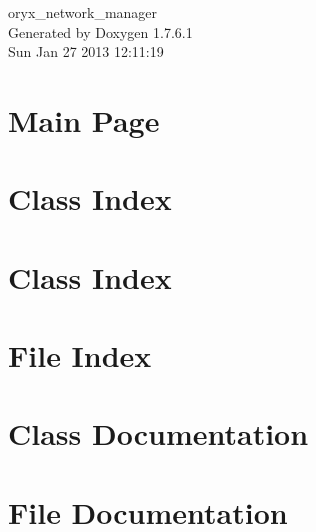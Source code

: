 \documentclass[a4paper]{book}
\begin{document}
\begin{titlepage}
\vspace*{7cm}
\begin{center}
{\Large oryx\-\_\-network\-\_\-manager }\\
\vspace*{1cm}
{\large \-Generated by Doxygen 1.7.6.1}\\
\vspace*{0.5cm}
{\small Sun Jan 27 2013 12:11:19}\\
\end{center}
\end{titlepage}
\clearemptydoublepage
{}
\tableofcontents
\clearemptydoublepage
{}
\chapter{\-Main \-Page}
\label{index}
\chapter{\-Class \-Index}

\chapter{\-Class \-Index}

\chapter{\-File \-Index}

\chapter{\-Class \-Documentation}








\chapter{\-File \-Documentation}














\printindex
\end{document}
